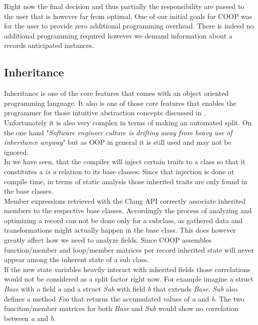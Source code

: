 Right now the final decision and thus partially the responsibility are passed to the user that is however far from optimal. One of our initial goals for COOP was for the user to provide zero additional programming overhead. There is indeed no additional programming required however we demand information about a records anticipated instances.

\subsection{Inheritance}\label{inheritance}
Inheritance is one of the core features that comes with an object oriented programming language. It also is one of those core features that enables the programmer for those intuitive abstraction concepts discussed in .\\
Unfortunately it is also very complex in terms of making an automated split. On the one hand "\textit{Software engineer culture is drifting away from heavy use of inheritance anyway}"  but as OOP in general it is still used and may not be ignored.\\
In  we have seen, that the compiler will inject certain traits to a class so that it constitutes a \textit{is a} relation to its base classes. Since that injection is done at compile time, in terms of static analysis those inherited traits are only found in the base classes.\\
Member expressions retrieved with the Clang API correctly associate inherited members to the respective base classes. Accordingly the process of analyzing and optimizing a record can not be done only for a subclass, as gathered data and transformations might actually happen in the base class. This does however greatly affect how we need to analyze fields. Since COOP assembles function/member and loop/member matrices per record inherited state will never appear among the inherent state of a sub class.\\
If the new state variables heavily interact with inherited fields those correlations would not be considered as a split factor right now. For example imagine a struct \textit{Base} with a field \textit{a} and a struct \textit{Sub} with field \textit{b} that extends \textit{Base}. \textit{Sub} also defines a method \textit{Foo} that returns the accumulated values of \textit{a} and \textit{b}. The two funciton/member matrices for both \textit{Base} and \textit{Sub} would show no correlation between \textit{a} and \textit{b}.
\newpage
